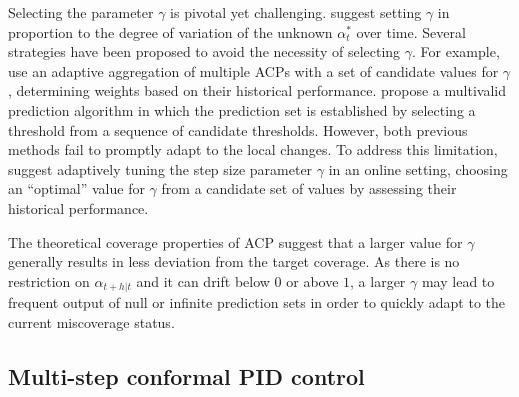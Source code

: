 \documentclass[
  11pt,
  12pt]{article}
\theoremstyle{plain}
\theoremstyle{remark}
\begin{document}
Selecting the parameter \(\gamma\) is pivotal yet challenging.
\citet{gibbs2021} suggest setting \(\gamma\) in proportion to the degree
of variation of the unknown \(\alpha_{t}^{*}\) over time. Several
strategies have been proposed to avoid the necessity of selecting
\(\gamma\). For example, \citet{zaffran2022} use an adaptive aggregation
of multiple ACPs with a set of candidate values for \(\gamma\) ,
determining weights based on their historical performance.
\citet{bastani2022} propose a multivalid prediction algorithm in which
the prediction set is established by selecting a threshold from a
sequence of candidate thresholds. However, both previous methods fail to
promptly adapt to the local changes. To address this limitation,
\citet{gibbs2024} suggest adaptively tuning the step size parameter
\(\gamma\) in an online setting, choosing an ``optimal'' value for
\(\gamma\) from a candidate set of values by assessing their historical
performance.

The theoretical coverage properties of ACP suggest that a larger value
for \(\gamma\) generally results in less deviation from the target
coverage. As there is no restriction on \(\alpha_{t+h|t}\) and it can
drift below \(0\) or above \(1\), a larger \(\gamma\) may lead to
frequent output of null or infinite prediction sets in order to quickly
adapt to the current miscoverage status.

\subsection{Multi-step conformal PID
control}\label{multi-step-conformal-pid-control}
\end{document}
